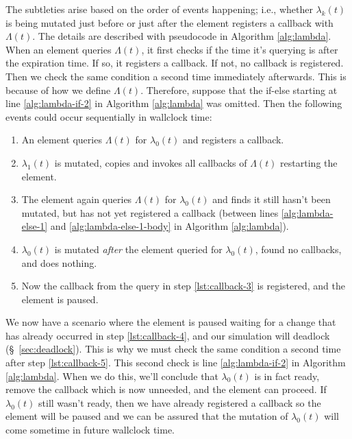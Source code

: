 \begin{bibunit}[unsrtnat]
The subtleties arise based on the order of events happening; i.e., whether
$\lambda_k(t)$ is being mutated just before or just after the element registers
a callback with $\Lambda(t)$. The details are described with pseudocode in
Algorithm \ref{alg:lambda}. When an element queries $\Lambda(t)$, it first
checks if the time it's querying is after the expiration time. If so, it
registers a callback. If not, no callback is registered. Then we check the same
condition a second time immediately afterwards. This is because of how we define
$\Lambda(t)$. Therefore, suppose that the if-else starting at line
\ref{alg:lambda-if-2} in Algorithm \ref{alg:lambda} was omitted.  Then the
following events could occur sequentially in wallclock time:
\begin{enumerate}
  \item An element queries $\Lambda(t)$ for $\lambda_0(t)$ and registers a
  callback.
  \item $\lambda_1(t)$ is mutated, copies and invokes all callbacks of
  $\Lambda(t)$ restarting the element.
  \item\label{lst:callback-3} The element again queries $\Lambda(t)$ for
  $\lambda_0(t)$ and finds it still hasn't been mutated, but has not yet
  registered a callback (between lines \ref{alg:lambda-else-1} and
  \ref{alg:lambda-else-1-body} in Algorithm \ref{alg:lambda}).
  \item\label{lst:callback-4} $\lambda_0(t)$ is mutated \textit{after} the
  element queried for $\lambda_0(t)$, found no callbacks, and does nothing.
  \item\label{lst:callback-5} Now the callback from the query in step
  \ref{lst:callback-3} is registered, and the element is paused.
\end{enumerate}
We now have a scenario where the element is paused waiting for a change that has
already occurred in step \ref{lst:callback-4}, and our simulation will deadlock
(\S~\ref{sec:deadlock}). This is why we must check the same condition a
second time after step \ref{lst:callback-5}. This second check is line
\ref{alg:lambda-if-2} in Algorithm \ref{alg:lambda}. When we do this, we'll
conclude that $\lambda_0(t)$ is in fact ready, remove the callback which is now
unneeded, and the element can proceed. If $\lambda_0(t)$ still wasn't ready,
then we have already registered a callback so the element will be paused and we
can be assured that the mutation of $\lambda_0(t)$ will come sometime in future
wallclock time.


\end{bibunit}
